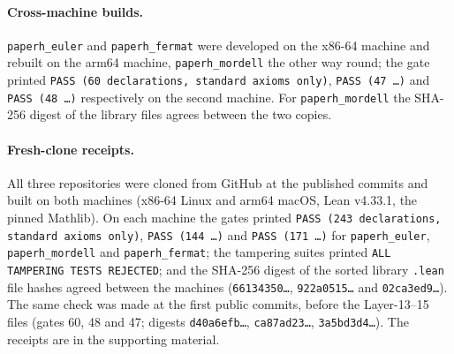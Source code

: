 \documentclass[11pt]{article}
\theoremstyle{definition}
\theoremstyle{remark}
\newcommand{\lean}[1]{\texttt{#1}}
\begin{document}
\paragraph{Cross-machine builds.} \lean{paperh\_euler} and \lean{paperh\_fermat} were developed on
the x86-64 machine and rebuilt on the arm64 machine, \lean{paperh\_mordell} the other way round; the
gate printed \lean{PASS (60 declarations, standard axioms only)}, \lean{PASS (47 \ldots)} and
\lean{PASS (48 \ldots)} respectively on the second machine. For \lean{paperh\_mordell} the SHA-256
digest of the library files agrees between the two copies.

\paragraph{Fresh-clone receipts.} All three repositories were cloned from GitHub at the published
commits and built on both machines (x86-64 Linux and arm64 macOS, Lean v4.33.1, the pinned
Mathlib). On each machine the gates printed \lean{PASS (243 declarations, standard axioms only)},
\lean{PASS (144 \ldots)} and \lean{PASS (171 \ldots)} for \lean{paperh\_euler},
\lean{paperh\_mordell} and \lean{paperh\_fermat}; the tampering suites printed
\lean{ALL TAMPERING TESTS REJECTED}; and the SHA-256 digest of the sorted library \lean{.lean} file
hashes agreed between the machines (\texttt{66134350\ldots}, \texttt{922a0515\ldots} and
\texttt{02ca3ed9\ldots}). The same check was made at the first public commits, before the Layer-13--15
files (gates 60, 48 and 47; digests \texttt{d40a6efb\ldots}, \texttt{ca87ad23\ldots},
\texttt{3a5bd3d4\ldots}). The receipts are in the supporting material.
\end{document}
